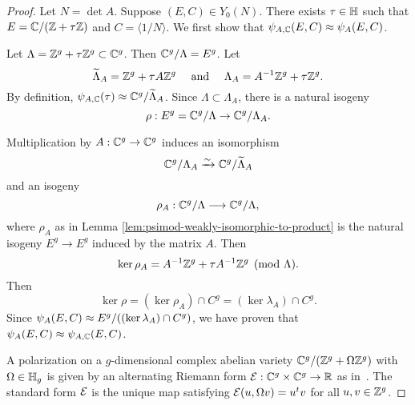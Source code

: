 \documentclass{amsart}
\begin{document}
\begin{proof}
Let  $N = \det A$.  Suppose $(E, C) \in Y_0(N)$. There exists $\tau \in \mathbb{H}$ such that $E = \mathbb{C}/(\mathbb{Z} + \tau \mathbb{Z})$ and $C = \langle 1/N \rangle$. We first show that ${\psi}_{A, \mathbb{C}}(E,C) \approx \psi_{A}(E,C)$.

  Let $\Lambda = \mathbb{Z}^g + \tau \mathbb{Z}^g \subset \mathbb{C}^g$. Then $\mathbb{C}^g/\Lambda = E^g$.
  Let
  \[
    \widetilde{\Lambda}_A = \mathbb{Z}^g + \tau A \mathbb{Z}^g \quad \text{ and } \quad     \Lambda_A = A^{-1}\mathbb{Z}^g + \tau \mathbb{Z}^g.
  \]
By definition, ${\psi}_{A, \mathbb{C}}(\tau) \approx \mathbb{C}^g/\widetilde{\Lambda}_A$.
 Since $\Lambda \subset \Lambda_A$, there is a natural isogeny
  \[
    \rho: E^g = \mathbb{C}^g/\Lambda \to \mathbb{C}^g/\Lambda_A.
  \]

  Multiplication by $A: \mathbb{C}^g \to \mathbb{C}^g$ induces an isomorphism
  \[
     \mathbb{C}^g/\Lambda_A \xrightarrow{\sim}  \mathbb{C}^g/\widetilde{\Lambda}_A
  \]
and an isogeny
  \[
    \rho_A: \mathbb{C}^g/\Lambda \longrightarrow \mathbb{C}^g/\Lambda,
  \]
  where $\rho_A$ as in Lemma \ref{lem:psimod-weakly-isomorphic-to-product} is the natural isogeny $E^g \to E^g$ induced by the matrix $A$. Then
\[
\ker \rho_A = A^{-1}\mathbb{Z}^g + \tau A^{-1} \mathbb{Z}^g \pmod{\Lambda}.
\]
Then
\[
\ker \rho = (\ker \rho_A) \cap C^g = (\ker \lambda_A) \cap C^g.
\]
Since $\psi_{A}(E,C) \approx E^g/((\ker \lambda_A) \cap C^g)$, we have proven that $\psi_{A}(E,C) \approx {\psi}_{A, \mathbb{C}}(E,C)$.

  A polarization on a $g$-dimensional complex abelian variety $\mathbb{C}^g/(\mathbb{Z}^g + \Omega \mathbb{Z}^g)$ with $\Omega \in \mathbb{H}_g$ is given by an alternating Riemann form $\mathcal{E}: \mathbb{C}^g \times \mathbb{C}^g \to \mathbb{R}$ as in~\cite{rosen-avc}. The standard form $\mathcal{E}$ is the unique map satisfying $\mathcal{E}(u,\Omega v) = u^tv$ for all $u,v \in \mathbb{Z}^g$. 


\end{proof}
\end{document}
